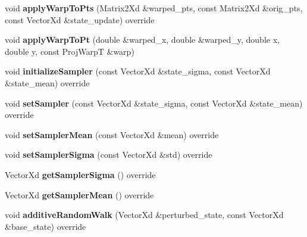 \begin{DoxyCompactItemize}
\item 
\hypertarget{classProjectiveBase_a92d023d6f8bcbb43a388f6ca4370f9a0}{void {\bfseries apply\-Warp\-To\-Pts} (Matrix2\-Xd \&warped\-\_\-pts, const Matrix2\-Xd \&orig\-\_\-pts, const Vector\-Xd \&state\-\_\-update) override}\label{classProjectiveBase_a92d023d6f8bcbb43a388f6ca4370f9a0}

\item 
\hypertarget{classProjectiveBase_a1b157bfe5f939ec7758910cbe78caf3d}{void {\bfseries apply\-Warp\-To\-Pt} (double \&warped\-\_\-x, double \&warped\-\_\-y, double x, double y, const Proj\-Warp\-T \&warp)}\label{classProjectiveBase_a1b157bfe5f939ec7758910cbe78caf3d}

\item 
\hypertarget{classProjectiveBase_a3ee1fa50839622d08ae5e7e3084cd9e1}{void {\bfseries initialize\-Sampler} (const Vector\-Xd \&state\-\_\-sigma, const Vector\-Xd \&state\-\_\-mean) override}\label{classProjectiveBase_a3ee1fa50839622d08ae5e7e3084cd9e1}

\item 
\hypertarget{classProjectiveBase_ab5028169af0f200ce45c4ae70a1b99d5}{void {\bfseries set\-Sampler} (const Vector\-Xd \&state\-\_\-sigma, const Vector\-Xd \&state\-\_\-mean) override}\label{classProjectiveBase_ab5028169af0f200ce45c4ae70a1b99d5}

\item 
\hypertarget{classProjectiveBase_a908d0d2550c76631485670635170a748}{void {\bfseries set\-Sampler\-Mean} (const Vector\-Xd \&mean) override}\label{classProjectiveBase_a908d0d2550c76631485670635170a748}

\item 
\hypertarget{classProjectiveBase_a0f2d9416232805a66db57a4693273272}{void {\bfseries set\-Sampler\-Sigma} (const Vector\-Xd \&std) override}\label{classProjectiveBase_a0f2d9416232805a66db57a4693273272}

\item 
\hypertarget{classProjectiveBase_ade383adc360feee255b6cf03f10f6cd9}{Vector\-Xd {\bfseries get\-Sampler\-Sigma} () override}\label{classProjectiveBase_ade383adc360feee255b6cf03f10f6cd9}

\item 
\hypertarget{classProjectiveBase_a803921874fcd49d27fb016a908fc3055}{Vector\-Xd {\bfseries get\-Sampler\-Mean} () override}\label{classProjectiveBase_a803921874fcd49d27fb016a908fc3055}

\item 
\hypertarget{classProjectiveBase_a130574c30fe7dd7f1cab6e8c9b55470a}{void {\bfseries additive\-Random\-Walk} (Vector\-Xd \&perturbed\-\_\-state, const Vector\-Xd \&base\-\_\-state) override}\label{classProjectiveBase_a130574c30fe7dd7f1cab6e8c9b55470a}


\end{DoxyCompactItemize}
